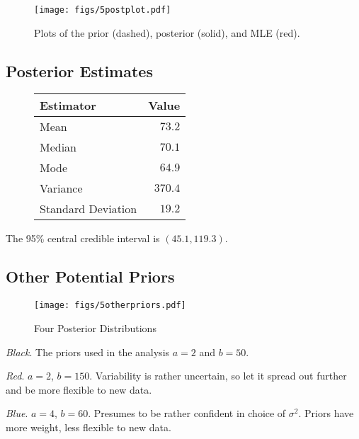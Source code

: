 \documentclass[12pt]{article}
\begin{document}
\begin{figure}[H]
\begin{center}
\texttt{[image: figs/5postplot.pdf]}
\caption{Plots of the prior (dashed), posterior (solid), and MLE (red).}
\end{center}
\end{figure}

\subsection{Posterior Estimates}

\begin{figure}[H]
\begin{center}
\begin{tabular}{l|r}
Estimator & \multicolumn{1}{l}{Value} \\ \hline \hline
Mean               & $73.2$ \\
Median             & $70.1$ \\
Mode               & $64.9$ \\
Variance           & $370.4$ \\
Standard Deviation & $19.2$ \\
\end{tabular}
\end{center}
\end{figure}

The 95\% central credible interval is $(45.1, 119.3)$.

\subsection{Other Potential Priors}

\begin{figure}[H]
\begin{center}
\texttt{[image: figs/5otherpriors.pdf]}
\caption{Four Posterior Distributions}
\end{center}
\end{figure}

\noindent \emph{Black}.  The priors used in the analysis $a=2$ and $b=50$.

\noindent \emph{Red}. $a=2$, $b=150$.  Variability is rather uncertain, so let it spread out further and be more flexible to new data.

\noindent \emph{Blue}. $a=4$, $b=60$.  Presumes to be rather confident in choice of $\sigma^2$.  Priors have more weight, less flexible to new data.
\end{document}
